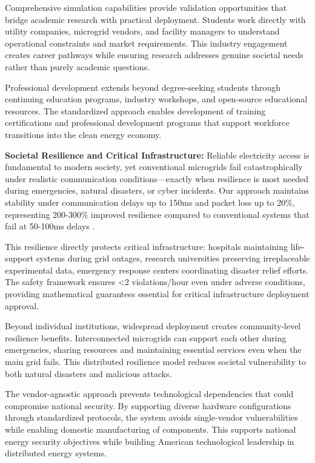\documentclass[12pt]{article}
\begin{document}
Comprehensive simulation capabilities provide validation opportunities that bridge academic research with practical deployment. Students work directly with utility companies, microgrid vendors, and facility managers to understand operational constraints and market requirements. This industry engagement creates career pathways while ensuring research addresses genuine societal needs rather than purely academic questions.

Professional development extends beyond degree-seeking students through continuing education programs, industry workshops, and open-source educational resources. The standardized approach enables development of training certifications and professional development programs that support workforce transitions into the clean energy economy.

\textbf{Societal Resilience and Critical Infrastructure:} Reliable electricity access is fundamental to modern society, yet conventional microgrids fail catastrophically under realistic communication conditions—exactly when resilience is most needed during emergencies, natural disasters, or cyber incidents. Our approach maintains stability under communication delays up to 150ms and packet loss up to 20\%, representing 200-300\% improved resilience compared to conventional systems that fail at 50-100ms delays \cite{baseline2023delay}.

This resilience directly protects critical infrastructure: hospitals maintaining life-support systems during grid outages, research universities preserving irreplaceable experimental data, emergency response centers coordinating disaster relief efforts. The safety framework ensures <2 violations/hour even under adverse conditions, providing mathematical guarantees essential for critical infrastructure deployment approval.

Beyond individual institutions, widespread deployment creates community-level resilience benefits. Interconnected microgrids can support each other during emergencies, sharing resources and maintaining essential services even when the main grid fails. This distributed resilience model reduces societal vulnerability to both natural disasters and malicious attacks.

The vendor-agnostic approach prevents technological dependencies that could compromise national security. By supporting diverse hardware configurations through standardized protocols, the system avoids single-vendor vulnerabilities while enabling domestic manufacturing of components. This supports national energy security objectives while building American technological leadership in distributed energy systems.
\end{document}
